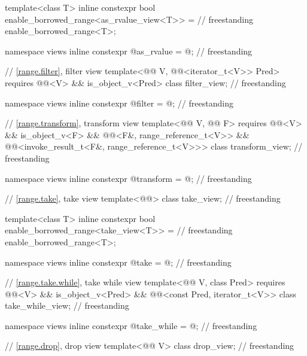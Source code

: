 \begin{codeblock}
{  template<class T>
    inline constexpr bool enable_borrowed_range<as_rvalue_view<T>> =                // freestanding
      enable_borrowed_range<T>;

  namespace views { inline constexpr @\unspecnc@ as_rvalue = @\unspecnc@; }         // freestanding

  // \ref{range.filter}, filter view
  template<@@ V, @@<iterator_t<V>> Pred>
    requires @@<V> && is_object_v<Pred>
  class filter_view;                                                                // freestanding

  namespace views { inline constexpr @\unspecnc@ filter = @\unspecnc@; }            // freestanding

  // \ref{range.transform}, transform view
  template<@@ V, @@ F>
    requires @@<V> && is_object_v<F> &&
             @@<F&, range_reference_t<V>> &&
             @@<invoke_result_t<F&, range_reference_t<V>>>
  class transform_view;                                                             // freestanding

  namespace views { inline constexpr @\unspecnc@ transform = @\unspecnc@; }         // freestanding

  // \ref{range.take}, take view
  template<@@> class take_view;                                                   // freestanding

  template<class T>
    inline constexpr bool enable_borrowed_range<take_view<T>> =                     // freestanding
      enable_borrowed_range<T>;

  namespace views { inline constexpr @\unspecnc@ take = @\unspecnc@; }              // freestanding

  // \ref{range.take.while}, take while view
  template<@@ V, class Pred>
    requires @@<V> && is_object_v<Pred> &&
             @@<const Pred, iterator_t<V>>
    class take_while_view;                                                          // freestanding

  namespace views { inline constexpr @\unspecnc@ take_while = @\unspecnc@; }        // freestanding

  // \ref{range.drop}, drop view
  template<@@ V>
    class drop_view;                                                                // freestanding

}
\end{codeblock}
